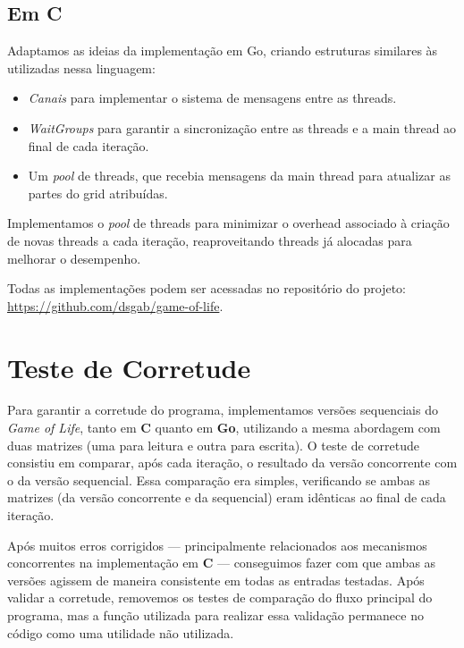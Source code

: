 \documentclass[14]{article}
\begin{document}
\subsection{Em C}

Adaptamos as ideias da implementação em Go, criando estruturas similares às utilizadas nessa linguagem:  
    \begin{itemize}  
        \item \textit{Canais} para implementar o sistema de mensagens entre as threads.  
        \item \textit{WaitGroups} para garantir a sincronização entre as threads e a main thread ao final de cada iteração.  
        \item Um \textit{pool} de threads, que recebia mensagens da main thread para atualizar as partes do grid atribuídas.  
    \end{itemize}  
    Implementamos o \textit{pool} de threads para minimizar o overhead associado à criação de novas threads a cada iteração, reaproveitando threads já alocadas para melhorar o desempenho.

    Todas as implementações podem ser acessadas no repositório do projeto: \url{https://github.com/dsgab/game-of-life}.  


\section{Teste de Corretude}  

Para garantir a corretude do programa, implementamos versões sequenciais do \textit{Game of Life}, tanto em \textbf{C} quanto em \textbf{Go}, utilizando a mesma abordagem com duas matrizes (uma para leitura e outra para escrita).  
O teste de corretude consistiu em comparar, após cada iteração, o resultado da versão concorrente com o da versão sequencial. Essa comparação era simples, verificando se ambas as matrizes (da versão concorrente e da sequencial) eram idênticas ao final de cada iteração.  

Após muitos erros corrigidos — principalmente relacionados aos mecanismos concorrentes na implementação em \textbf{C} — conseguimos fazer com que ambas as versões agissem de maneira consistente em todas as entradas testadas. Após validar a corretude, removemos os testes de comparação do fluxo principal do programa, mas a função utilizada para realizar essa validação permanece no código como uma utilidade não utilizada.  
\end{document}
